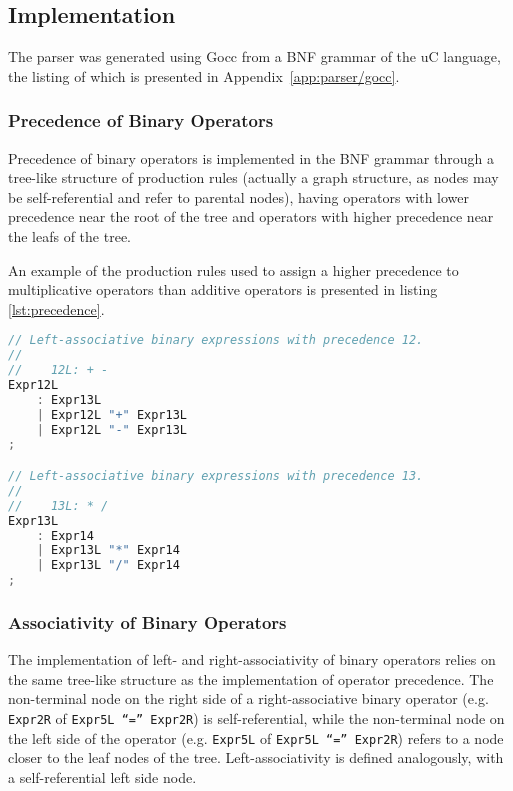 \subsection{Implementation}

The parser was generated using Gocc from a BNF grammar of the uC language, the listing of which is presented in Appendix~\ref{app:parser/gocc}.


\subsubsection{Precedence of Binary Operators}

Precedence of binary operators is implemented in the BNF grammar through a tree-like structure of production rules (actually a graph structure, as nodes may be self-referential and refer to parental nodes), having operators with lower precedence near the root of the tree and operators with higher precedence near the leafs of the tree.

An example of the production rules used to assign a higher precedence to multiplicative operators than additive operators is presented in listing \ref{lst:precedence}.

\begin{lstlisting}[language=go,style=go,caption={\label{lst:precedence}Precedence of binary expressions.}]
// Left-associative binary expressions with precedence 12.
//
//    12L: + -
Expr12L
	: Expr13L
	| Expr12L "+" Expr13L
	| Expr12L "-" Expr13L
;

// Left-associative binary expressions with precedence 13.
//
//    13L: * /
Expr13L
	: Expr14
	| Expr13L "*" Expr14
	| Expr13L "/" Expr14
;
\end{lstlisting}

\subsubsection{Associativity of Binary Operators}

The implementation of left- and right-associativity of binary operators relies on the same tree-like structure as the implementation of operator precedence. The non-terminal node on the right side of a right-associative binary operator (e.g. \texttt{Expr2R} of \texttt{Expr5L ``='' Expr2R}) is self-referential, while the non-terminal node on the left side of the operator (e.g. \texttt{Expr5L} of \texttt{Expr5L ``='' Expr2R}) refers to a node closer to the leaf nodes of the tree. Left-associativity is defined analogously, with a self-referential left side node.

